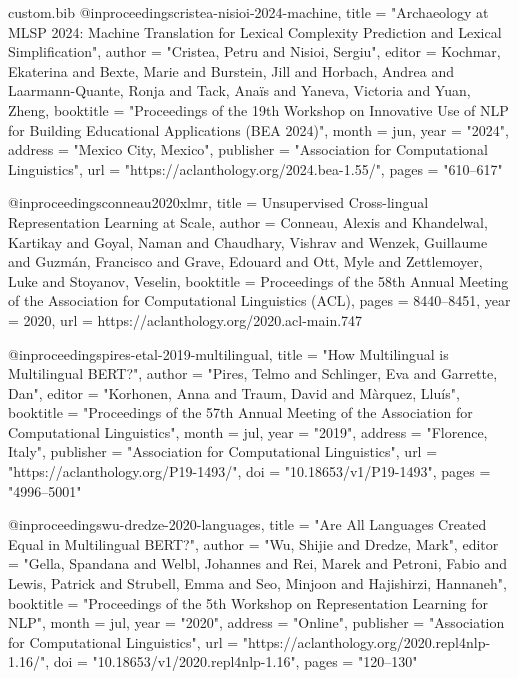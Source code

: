 \begin{filecontents*}[overwrite]{custom.bib}
@inproceedings{cristea-nisioi-2024-machine,
    title = "Archaeology at {MLSP} 2024: Machine Translation for Lexical Complexity Prediction and Lexical Simplification",
    author = "Cristea, Petru  and
      Nisioi, Sergiu",
    editor = {Kochmar, Ekaterina  and
      Bexte, Marie  and
      Burstein, Jill  and
      Horbach, Andrea  and
      Laarmann-Quante, Ronja  and
      Tack, Ana{\"i}s  and
      Yaneva, Victoria  and
      Yuan, Zheng},
    booktitle = "Proceedings of the 19th Workshop on Innovative Use of NLP for Building Educational Applications (BEA 2024)",
    month = jun,
    year = "2024",
    address = "Mexico City, Mexico",
    publisher = "Association for Computational Linguistics",
    url = "https://aclanthology.org/2024.bea-1.55/",
    pages = "610--617"
}

@inproceedings{conneau2020xlmr,
  title        = {Unsupervised Cross-lingual Representation Learning at Scale},
  author       = {Conneau, Alexis and Khandelwal, Kartikay and Goyal, Naman and Chaudhary, Vishrav and Wenzek, Guillaume and Guzm{\'a}n, Francisco and Grave, Edouard and Ott, Myle and Zettlemoyer, Luke and Stoyanov, Veselin},
  booktitle    = {Proceedings of the 58th Annual Meeting of the Association for Computational Linguistics (ACL)},
  pages        = {8440--8451},
  year         = {2020},
  url          = {https://aclanthology.org/2020.acl-main.747}
}

@inproceedings{pires-etal-2019-multilingual,
    title = "How Multilingual is Multilingual {BERT}?",
    author = "Pires, Telmo  and
      Schlinger, Eva  and
      Garrette, Dan",
    editor = "Korhonen, Anna  and
      Traum, David  and
      M{\`a}rquez, Llu{\'i}s",
    booktitle = "Proceedings of the 57th Annual Meeting of the Association for Computational Linguistics",
    month = jul,
    year = "2019",
    address = "Florence, Italy",
    publisher = "Association for Computational Linguistics",
    url = "https://aclanthology.org/P19-1493/",
    doi = "10.18653/v1/P19-1493",
    pages = "4996--5001"
}

@inproceedings{wu-dredze-2020-languages,
    title = "Are All Languages Created Equal in Multilingual {BERT}?",
    author = "Wu, Shijie  and
      Dredze, Mark",
    editor = "Gella, Spandana  and
      Welbl, Johannes  and
      Rei, Marek  and
      Petroni, Fabio  and
      Lewis, Patrick  and
      Strubell, Emma  and
      Seo, Minjoon  and
      Hajishirzi, Hannaneh",
    booktitle = "Proceedings of the 5th Workshop on Representation Learning for NLP",
    month = jul,
    year = "2020",
    address = "Online",
    publisher = "Association for Computational Linguistics",
    url = "https://aclanthology.org/2020.repl4nlp-1.16/",
    doi = "10.18653/v1/2020.repl4nlp-1.16",
    pages = "120--130"
}


\end{filecontents*}
